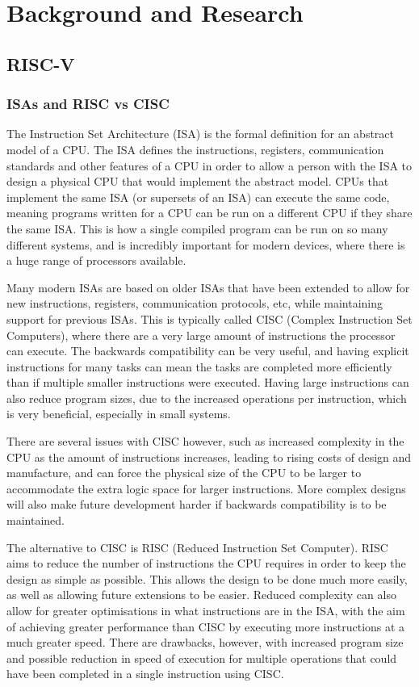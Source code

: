 \chapter{Background and Research}
\label{ch:background}

\section{RISC-V}
\label{sec:riscv-background}
\subsection{ISAs and RISC vs CISC}
The Instruction Set Architecture (ISA) is the formal definition for an abstract model of a CPU. The ISA defines the instructions, registers, communication standards and other features of a CPU in order to allow a person with the ISA to design a physical CPU that would implement the abstract model. CPUs that implement the same ISA (or supersets of an ISA) can execute the same code, meaning programs written for a CPU can be run on a different CPU if they share the same ISA. This is how a single compiled program can be run on so many different systems, and is incredibly important for modern devices, where there is a huge range of processors available.

Many modern ISAs are based on older ISAs that have been extended to allow for new instructions, registers, communication protocols, etc, while maintaining support for previous ISAs. This is typically called CISC (Complex Instruction Set Computers), where there are a very large amount of instructions the processor can execute. The backwards compatibility can be very useful, and having explicit instructions for many tasks can mean the tasks are completed more efficiently than if multiple smaller instructions were executed. Having large instructions can also reduce program sizes, due to the increased operations per instruction, which is very beneficial, especially in small systems\cite[chapter~1]{steveheath}.

There are several issues with CISC however, such as increased complexity in the CPU as the amount of instructions increases, leading to rising costs of design and manufacture, and can force the physical size of the CPU to be larger to accommodate the extra logic space for larger instructions. More complex designs will also make future development harder if backwards compatibility is to be maintained.

The alternative to CISC is RISC (Reduced Instruction Set Computer). RISC aims to reduce the number of instructions the CPU requires in order to keep the design as simple as possible. This allows the design to be done much more easily, as well as allowing future extensions to be easier. Reduced complexity can also allow for greater optimisations in what instructions are in the ISA, with the aim of achieving greater performance than CISC by executing more instructions at a much greater speed. There are drawbacks, however, with increased program size and possible reduction in speed of execution for multiple operations that could have been completed in a single instruction using CISC\cite[chapter~3]{steveheath}.

